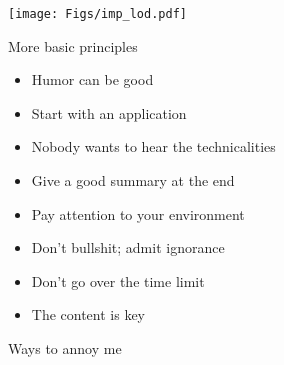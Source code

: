 \documentclass[12pt]{article}
\newcommand{\headsize}{\fontsize{35}{35} \selectfont}
\newcommand{\smallsize}{\fontsize{25}{30} \selectfont}
\begin{document}
\vfill

\centerline{\texttt{[image: Figs/imp\_lod.pdf]}}



\newpage

\headsize \color{myyellow}
\hfill \begin{minipage}{5.75in}
\centering
More basic principles
\end{minipage}

\vspace{30mm} \color{mywhite} \smallsize

\hfill \begin{minipage}{9.5in}

\begin{itemize}
\itemsep18pt
\item Humor can be good

\item Start with an application

\item Nobody wants to hear the technicalities

\item Give a good summary at the end

\item Pay attention to your environment

\item Don't bullshit; admit ignorance

\item Don't go over the time limit

\item The content is key

\end{itemize}

\end{minipage}



\newpage

\headsize \color{myyellow}
\hfill \begin{minipage}{5.75in}
\centering
Ways to annoy me
\end{minipage}

\vspace{30mm} \color{mywhite} \smallsize
\end{document}
